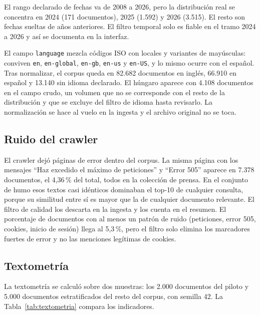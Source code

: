 \documentclass[11pt]{tg_usta}
\begin{document}
El rango declarado de fechas va de 2008 a 2026, pero la distribución real se concentra en 2024 (171 documentos), 2025 (1.592) y 2026 (3.515). El resto son fechas sueltas de años anteriores. El filtro temporal solo es fiable en el tramo 2024 a 2026 y así se documenta en la interfaz.

El campo \texttt{language} mezcla códigos ISO con locales y variantes de mayúsculas: conviven \texttt{en}, \texttt{en-global}, \texttt{en-gb}, \texttt{en-us} y \texttt{en-US}, y lo mismo ocurre con el español. Tras normalizar, el corpus queda en 82.682 documentos en inglés, 66.910 en español y 13.140 sin idioma declarado. El húngaro aparece con 4.108 documentos en el campo crudo, un volumen que no se corresponde con el resto de la distribución y que se excluye del filtro de idioma hasta revisarlo. La normalización se hace al vuelo en la ingesta y el archivo original no se toca.

\subsection{Ruido del crawler}

El crawler dejó páginas de error dentro del corpus. La misma página con los mensajes ``Haz excedido el máximo de peticiones'' y ``Error 505'' aparece en 7.378 documentos, el 4,36\,\% del total, todos en la colección de prensa. En el conjunto de humo esos textos casi idénticos dominaban el top-10 de cualquier consulta, porque su similitud entre sí es mayor que la de cualquier documento relevante. El filtro de calidad los descarta en la ingesta y los cuenta en el resumen. El porcentaje de documentos con al menos un patrón de ruido (peticiones, error 505, cookies, inicio de sesión) llega al 5,3\,\%, pero el filtro solo elimina los marcadores fuertes de error y no las menciones legítimas de cookies.

\subsection{Textometría}

La textometría se calculó sobre dos muestras: los 2.000 documentos del piloto y 5.000 documentos estratificados del resto del corpus, con semilla 42. La Tabla~\ref{tab:textometria} compara los indicadores.
\end{document}
